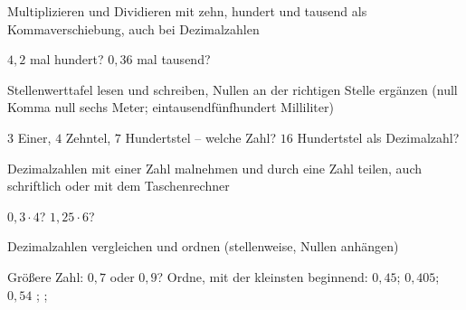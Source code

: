 \setcounter{aufgabe}{0}

\begin{aufgabe}{Multiplizieren und Dividieren mit zehn, hundert und tausend als Kommaverschiebung, auch bei Dezimalzahlen}
\begin{teile}
\teil $4{,}2$ mal hundert? \leerfeld
\teil $0{,}36$ mal tausend? \leerfeld
\end{teile}
\end{aufgabe}

\begin{aufgabe}{Stellenwerttafel lesen und schreiben, Nullen an der richtigen Stelle ergänzen (null Komma null sechs Meter; eintausendfünfhundert Milliliter)}
\begin{teile}
\teil $3$ Einer, $4$ Zehntel, $7$ Hundertstel – welche Zahl? \leerfeld
\teil $16$ Hundertstel als Dezimalzahl? \leerfeld
\end{teile}
\end{aufgabe}

\begin{aufgabe}{Dezimalzahlen mit einer Zahl malnehmen und durch eine Zahl teilen, auch schriftlich oder mit dem Taschenrechner}
\begin{teile}
\teil $0{,}3 \cdot 4$? \leerfeld
\teil $1{,}25 \cdot 6$? \leerfeld
\end{teile}
\end{aufgabe}

\begin{aufgabe}{Dezimalzahlen vergleichen und ordnen (stellenweise, Nullen anhängen)}
\begin{teile}
\teil Größere Zahl: $0{,}7$ oder $0{,}9$? \leerfeld
\teil Ordne, mit der kleinsten beginnend: $0{,}45$; $0{,}405$; $0{,}54$ \leerfeld ; \leerfeld ; \leerfeld
\end{teile}
\end{aufgabe}


